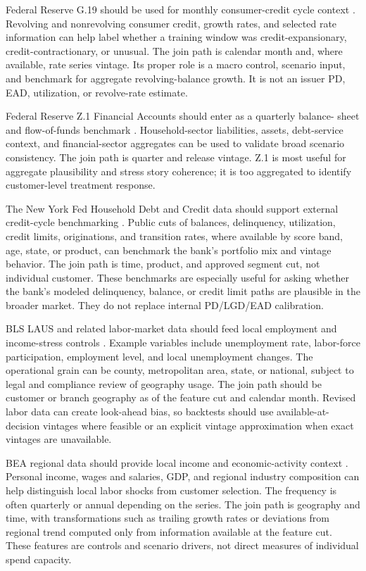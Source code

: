 \documentclass[11pt]{article}
\newcommand{\1}{\mathbf{1}}
\begin{document}
Federal Reserve G.19 should be used for monthly consumer-credit cycle context
\citep{federalreserveG19}. Revolving and nonrevolving consumer credit, growth
rates, and selected rate information can help label whether a training window
was credit-expansionary, credit-contractionary, or unusual. The join path is
calendar month and, where available, rate series vintage. Its proper role is a
macro control, scenario input, and benchmark for aggregate revolving-balance
growth. It is not an issuer PD, EAD, utilization, or revolve-rate estimate.

Federal Reserve Z.1 Financial Accounts should enter as a quarterly balance-
sheet and flow-of-funds benchmark \citep{federalreserveZ1}. Household-sector
liabilities, assets, debt-service context, and financial-sector aggregates can
be used to validate broad scenario consistency. The join path is quarter and
release vintage. Z.1 is most useful for aggregate plausibility and stress
story coherence; it is too aggregated to identify customer-level treatment
response.

The New York Fed Household Debt and Credit data should support external
credit-cycle benchmarking \citep{nyfedHhdc}. Public cuts of balances,
delinquency, utilization, credit limits, originations, and transition rates,
where available by score band, age, state, or product, can benchmark the
bank's portfolio mix and vintage behavior. The join path is time, product, and
approved segment cut, not individual customer. These benchmarks are especially
useful for asking whether the bank's modeled delinquency, balance, or credit
limit paths are plausible in the broader market. They do not replace internal
PD/LGD/EAD calibration.

BLS LAUS and related labor-market data should feed local employment and
income-stress controls \citep{blsLAUS}. Example variables include unemployment
rate, labor-force participation, employment level, and local unemployment
changes. The operational grain can be county, metropolitan area, state, or
national, subject to legal and compliance review of geography usage. The join
path should be customer or branch geography as of the feature cut and calendar
month. Revised labor data can create look-ahead bias, so backtests should use
available-at-decision vintages where feasible or an explicit vintage
approximation when exact vintages are unavailable.

BEA regional data should provide local income and economic-activity context
\citep{beaRegional}. Personal income, wages and salaries, GDP, and regional
industry composition can help distinguish local labor shocks from customer
selection. The frequency is often quarterly or annual depending on the series.
The join path is geography and time, with transformations such as trailing
growth rates or deviations from regional trend computed only from information
available at the feature cut. These features are controls and scenario
drivers, not direct measures of individual spend capacity.
\end{document}
